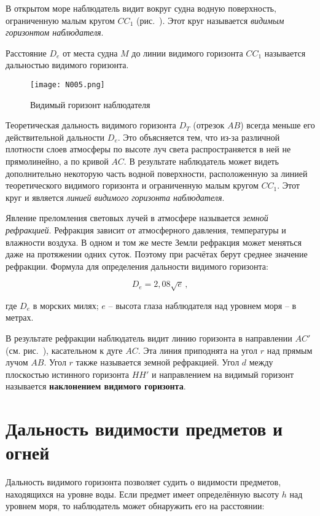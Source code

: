 В открытом море наблюдатель видит вокруг судна водную поверхность,
ограниченную малым кругом $CC_1$ (рис.~). Этот круг называется
\textit{видимым горизонтом наблюдателя}.

Расстояние $D_e$ от места судна $M$ до линии видимого горизонта $CC_1$
называется дальностью видимого горизонта.

\begin{figure}[htb]
  \centering{}
  \texttt{[image: N005.png]}
  \caption{Видимый горизонт наблюдателя}
  \label{fig:N5}
\end{figure}

Теоретическая дальность видимого горизонта $D_T$ (отрезок $AB$) всегда
меньше его действительной дальности $D_e$. Это объясняется тем, что
из-за различной плотности слоев атмосферы по высоте луч света
распространяется в ней не прямолинейно, а по кривой $AC$. В результате
наблюдатель может видеть дополнительно некоторую часть водной
поверхности, расположенную за линией теоретического видимого горизонта
и ограниченную малым кругом $CC_1$. Этот круг и является \textit{линией
видимого горизонта наблюдателя}.

Явление преломления световых лучей в атмосфере называется
\textit{земной рефракцией}. Рефракция зависит
от атмосферного давления, температуры и влажности воздуха. В одном и
том же месте Земли рефракция может меняться даже на протяжении одних
суток. Поэтому при расчётах берут среднее значение рефракции. Формула
для определения дальности видимого горизонта:

\begin{equation}
  D_e = 2,08 \sqrt{e} \, ,
\end{equation}

где $D_e$ в морских милях; $e$ \--- высота глаза наблюдателя над
уровнем моря \--- в метрах.

В результате рефракции наблюдатель видит линию горизонта в направлении
$AC'$ (см. рис.~), касательном к дуге $AC$. Эта линия
приподнята на угол $r$ над прямым лучом $AB$. Угол $r$ также
называется земной рефракцией. Угол $d$ между плоскостью истинного
горизонта $HH'$ и направлением на видимый горизонт называется
\textbf{наклонением видимого горизонта}.

\section{Дальность видимости предметов и огней}

Дальность видимого горизонта позволяет судить о видимости предметов,
находящихся на уровне воды. Если предмет имеет определённую высоту $h$
над уровнем моря, то наблюдатель может обнаружить его на расстоянии:

